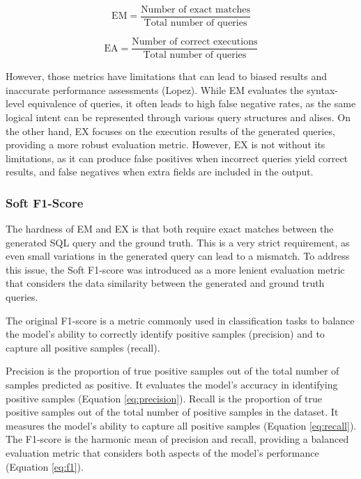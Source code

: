 \begin{equation}
    \text{EM} = \frac{\text{Number of exact matches}}{\text{Total number of queries}}
\end{equation}

\begin{equation}
    \text{EA} = \frac{\text{Number of correct executions}}{\text{Total number of queries}}
\end{equation}


However, those metrics have limitations that can lead to biased results and inaccurate performance assessments (Lopez). While EM evaluates the syntax-level equivalence of queries, it often leads to high false negative rates, as the same logical intent can be represented through various query structures and alises. On the other hand, EX focuses on the execution results of the generated queries, providing a more robust evaluation metric. However, EX is not without its limitations, as it can produce false positives when incorrect queries yield correct results, and false negatives when extra fields are included in the output.

\subsubsection{Soft F1-Score}

The hardness of EM and EX is that both require exact matches between the generated SQL query and the ground truth. This is a very strict requirement, as even small variations in the generated query can lead to a mismatch. To address this issue, the Soft F1-score was introduced as a more lenient evaluation metric that considers the data similarity between the generated and ground truth queries. 

The original F1-score is a metric commonly used in classification tasks to balance the model's ability to correctly identify positive samples (precision) and to capture all positive samples (recall). 

Precision is the proportion of true positive samples out of the total number of samples predicted as positive. It evaluates the model's accuracy in identifying positive samples (Equation \ref{eq:precision}). Recall is the proportion of true positive samples out of the total number of positive samples in the dataset. It measures the model's ability to capture all positive samples (Equation \ref{eq:recall}). The F1-score is the harmonic mean of precision and recall, providing a balanced evaluation metric that considers both aspects of the model's performance (Equation \ref{eq:f1}).

